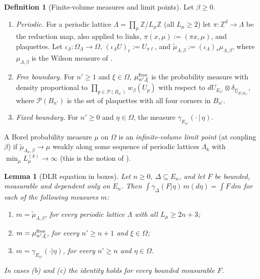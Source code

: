 \documentclass[11pt,a4paper]{article}
\newtheorem{lemma}[theorem]{Lemma}
\theoremstyle{definition}
\newtheorem{definition}[theorem]{Definition}
\theoremstyle{remark}
\newcommand{\Z}{\mathbb{Z}}
\newcommand{\cP}{\mathcal{P}}
\newcommand{\Fref}[3]{\cite[#1~`#2' (\texttt{#3})]{F}}
\newcommand{\IIIref}[3]{\cite[#1~`#2' (\texttt{#3})]{III}}
\begin{document}
\begin{definition}[Finite-volume measures and limit points]\label{iv:def:finitevol}
Let $\beta\ge0$.
\begin{enumerate}[label=(\alph*)]
\item \emph{Periodic.} For a periodic lattice $\Lambda=\prod_\mu\Z/L_\mu\Z$ (all $L_\mu\ge2$) let $\pi:\Z^d\to\Lambda$ be the
reduction map, also applied to links, $\pi(x,\mu):=(\pi x,\mu)$, and plaquettes. Let $\iota_\Lambda:\Omega_\Lambda\to\Omega$,
$(\iota_\Lambda U)_\ell:=U_{\pi\ell}$, and $\tilde\mu_{\Lambda,\beta}:=(\iota_\Lambda)_*\mu_{\Lambda,\beta}$, where $\mu_{\Lambda,\beta}$
is the Wilson measure of \Fref{Definition}{Wilson measure}{def:wilson}.
\item \emph{Free boundary.} For $n'\ge1$ and $\xi\in\Omega$, $\mu^{\rm free}_{n',\xi}$ is the probability measure with density
proportional to $\prod_{p\in\cP(B_{n'})}w_\beta(U_p)$ with respect to $dU_{E_{n'}}\otimes\delta_{\xi|_{E\setminus E_{n'}}}$, where
$\cP(B_{n'})$ is the set of plaquettes with all four corners in $B_{n'}$.
\item \emph{Fixed boundary.} For $n'\ge0$ and $\eta\in\Omega$, the measure $\gamma_{E_{n'}}(\cdot\,|\,\eta)$.
\end{enumerate}
A Borel probability measure $\mu$ on $\Omega$ is an \emph{infinite-volume limit point} (at coupling $\beta$) if
$\tilde\mu_{\Lambda_k,\beta}\to\mu$ weakly along some sequence of periodic lattices $\Lambda_k$ with
$\min_\mu L^{(k)}_\mu\to\infty$ (this is the notion of \IIIref{Definition}{Periodisation and infinite-volume limit
points}{al:def:limitpoints}).
\end{definition}

\begin{lemma}[DLR equation in boxes]\label{iv:lem:boxDLR}
Let $n\ge0$, $\Delta\subseteq E_n$, and let $F$ be bounded, measurable and dependent only on $E_n$. Then
$\int\gamma_\Delta(F|\eta)\,m(d\eta)=\int F\,dm$ for each of the following measures $m$:
\begin{enumerate}[label=(\alph*)]
\item $m=\tilde\mu_{\Lambda,\beta}$, for every periodic lattice $\Lambda$ with all $L_\mu\ge2n+3$;
\item $m=\mu^{\rm free}_{n',\xi}$, for every $n'\ge n+1$ and $\xi\in\Omega$;
\item $m=\gamma_{E_{n'}}(\cdot|\eta)$, for every $n'\ge n$ and $\eta\in\Omega$.
\end{enumerate}
In cases (b) and (c) the identity holds for every bounded measurable $F$.
\end{lemma}
\end{document}
